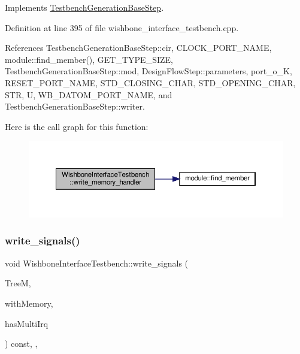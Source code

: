 Implements \hyperlink{classTestbenchGenerationBaseStep_a5c3f6e20a10e10fd2abded2de983d6ad}{Testbench\+Generation\+Base\+Step}.



Definition at line 395 of file wishbone\+\_\+interface\+\_\+testbench.\+cpp.



References Testbench\+Generation\+Base\+Step\+::cir, C\+L\+O\+C\+K\+\_\+\+P\+O\+R\+T\+\_\+\+N\+A\+ME, module\+::find\+\_\+member(), G\+E\+T\+\_\+\+T\+Y\+P\+E\+\_\+\+S\+I\+ZE, Testbench\+Generation\+Base\+Step\+::mod, Design\+Flow\+Step\+::parameters, port\+\_\+o\+\_\+K, R\+E\+S\+E\+T\+\_\+\+P\+O\+R\+T\+\_\+\+N\+A\+ME, S\+T\+D\+\_\+\+C\+L\+O\+S\+I\+N\+G\+\_\+\+C\+H\+AR, S\+T\+D\+\_\+\+O\+P\+E\+N\+I\+N\+G\+\_\+\+C\+H\+AR, S\+TR, U, W\+B\+\_\+\+D\+A\+T\+O\+M\+\_\+\+P\+O\+R\+T\+\_\+\+N\+A\+ME, and Testbench\+Generation\+Base\+Step\+::writer.

Here is the call graph for this function\+:
\nopagebreak
\begin{figure}[H]
\begin{center}
\leavevmode
\includegraphics[width=350pt]{de/ded/classWishboneInterfaceTestbench_aa94678609b7c8f3c402a0642776f9fda_cgraph}
\end{center}
\end{figure}
\mbox{\label{classWishboneInterfaceTestbench_af319e1ea1cb928d2d4ce67815622b62e}} 
\subsubsection{\texorpdfstring{write\+\_\+signals()}{write\_signals()}}
{\footnotesize\ttfamily void Wishbone\+Interface\+Testbench\+::write\+\_\+signals (\begin{DoxyParamCaption}\item[{const \hyperlink{tree__manager_8hpp_a792e3f1f892d7d997a8d8a4a12e39346}{tree\+\_\+manager\+Const\+Ref}}]{TreeM,  }\item[{bool \&}]{with\+Memory,  }\item[{bool \&}]{has\+Multi\+Irq }\end{DoxyParamCaption}) const\hspace{0.3cm}{\ttfamily [override]}, {\ttfamily [protected]}, {\ttfamily [virtual]}}

